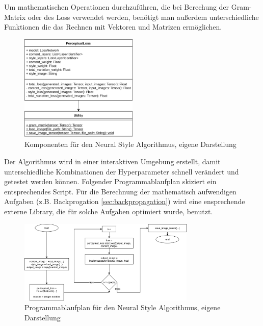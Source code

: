 Um mathematischen Operationen durchzuführen, die bei Berechung der Gram-Matrix oder des Loss verwendet werden, benötigt man außerdem unterschiedliche Funktionen die das Rechnen mit Vektoren und Matrizen ermöglichen.


\begin{figure}[H]
	\centering
	\includegraphics[width=0.50\textwidth]{resources/content/neural_style_class_diagram.png}
	\caption{Komponenten für den Neural Style Algorithmus, eigene Darstellung}
	\label{img:neural_style_class_diagram_img}
\end{figure}

Der Algorithmus wird in einer interaktiven Umgebung erstellt, damit unterschiedliche Kombinationen der Hyperparameter schnell verändert und getestet werden können. Folgender Programmablaufplan skiziert ein entsprechendes Script. Für die Berechnung der mathematisch aufwendigen Aufgaben (z.B. Backprogation \ref{sec:backpropagation}) wird eine ensprechende externe Library, die für solche Aufgaben optimiert wurde, benutzt.

\begin{figure}[H]
	\centering
	\includegraphics[width=0.75\textwidth]{resources/content/neural_style_pap.png}
	\caption{Programmablaufplan für den Neural Style Algorithmus, eigene Darstellung}
	\label{img:neural_style_pap_img}
\end{figure}

